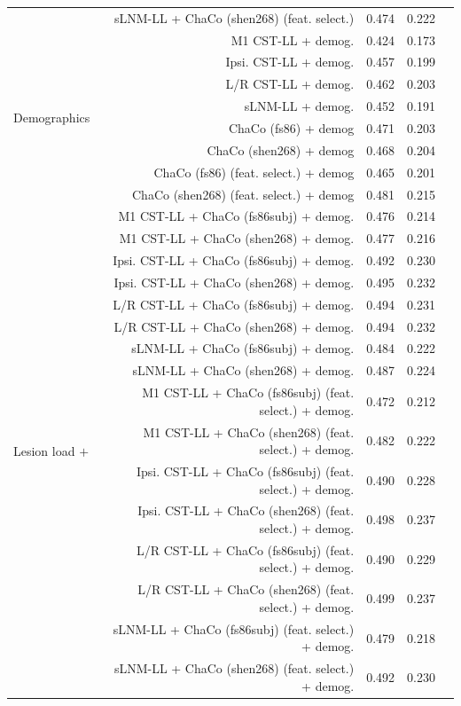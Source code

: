 \documentclass[10pt]{article}
\def\Plus{\texttt{+}}
\begin{document}
\begin{table}[h]
\begin{tabular}{lrrll}
 & sLNM-LL + ChaCo (shen268) (feat. select.) & 0.474 & 0.222 \\
\multirow[t]{8}{*}{Demographics} & M1 CST-LL + demog. & 0.424 & 0.173 \\
 & Ipsi. CST-LL + demog. & 0.457 & 0.199 \\
 & L/R CST-LL + demog. & 0.462 & 0.203 \\
 & sLNM-LL + demog. & 0.452 & 0.191 \\
 & ChaCo (fs86) + demog & 0.471 & 0.203 \\
 & ChaCo (shen268) + demog & 0.468 & 0.204 \\
 & ChaCo (fs86) (feat. select.) + demog & 0.465 & 0.201 \\
 & ChaCo (shen268) (feat. select.) + demog & 0.481 & 0.215 \\
\multirow[t]{16}{*}{Lesion load $\Plus$} & M1 CST-LL + ChaCo (fs86subj) + demog. & 0.476 & 0.214 \\
 ChaCo $\Plus$ & M1 CST-LL + ChaCo (shen268) + demog. & 0.477 & 0.216 \\
 Demographics & Ipsi. CST-LL + ChaCo (fs86subj) + demog. & 0.492 & 0.230 \\
 & Ipsi. CST-LL + ChaCo (shen268) + demog. & 0.495 & 0.232 \\
 & L/R CST-LL + ChaCo (fs86subj) + demog. & 0.494 & 0.231 \\
 & L/R CST-LL + ChaCo (shen268) + demog. & 0.494 & 0.232 \\
 & sLNM-LL + ChaCo (fs86subj) + demog. & 0.484 & 0.222 \\
 & sLNM-LL + ChaCo (shen268) + demog. & 0.487 & 0.224 \\
 & M1 CST-LL + ChaCo (fs86subj) (feat. select.) + demog. & 0.472 & 0.212 \\
 & M1 CST-LL + ChaCo (shen268) (feat. select.) + demog. & 0.482 & 0.222 \\
 & Ipsi. CST-LL + ChaCo (fs86subj) (feat. select.) + demog. & 0.490 & 0.228 \\
 & Ipsi. CST-LL + ChaCo (shen268) (feat. select.) + demog. & 0.498 & 0.237 \\
 & L/R CST-LL + ChaCo (fs86subj) (feat. select.) + demog. & 0.490 & 0.229 \\
 & L/R CST-LL + ChaCo (shen268) (feat. select.) + demog. & 0.499 & 0.237 \\
 & sLNM-LL + ChaCo (fs86subj) (feat. select.) + demog. & 0.479 & 0.218 \\
 & sLNM-LL + ChaCo (shen268) (feat. select.) + demog. & 0.492 & 0.230 \\
 

\end{tabular}
\end{table}
\end{document}

